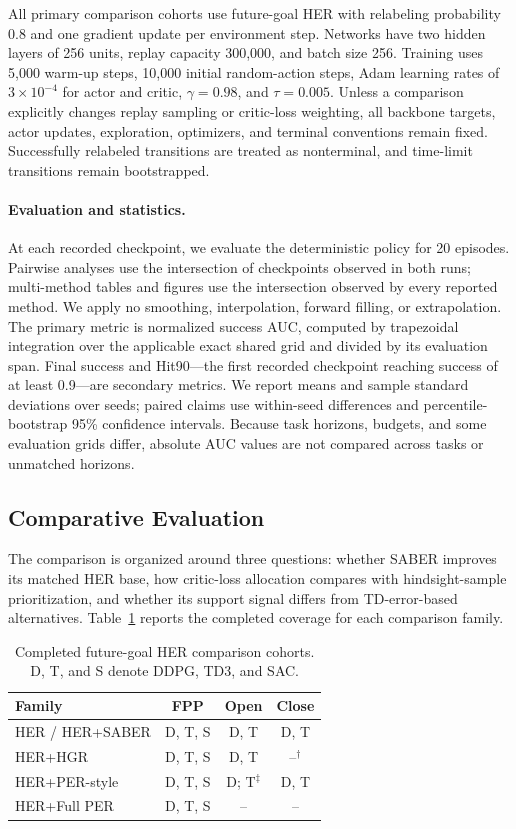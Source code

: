 \documentclass[letterpaper]{article}
\begin{document}
All primary comparison cohorts use future-goal HER with relabeling probability 0.8 and one gradient update per environment step. Networks have two hidden layers of 256 units, replay capacity 300,000, and batch size 256. Training uses 5,000 warm-up steps, 10,000 initial random-action steps, Adam learning rates of \(3\times10^{-4}\) for actor and critic, \(\gamma=0.98\), and \(\tau=0.005\). Unless a comparison explicitly changes replay sampling or critic-loss weighting, all backbone targets, actor updates, exploration, optimizers, and terminal conventions remain fixed. Successfully relabeled transitions are treated as nonterminal, and time-limit transitions remain bootstrapped.

\paragraph{Evaluation and statistics.}
At each recorded checkpoint, we evaluate the deterministic policy for 20 episodes. Pairwise analyses use the intersection of checkpoints observed in both runs; multi-method tables and figures use the intersection observed by every reported method. We apply no smoothing, interpolation, forward filling, or extrapolation. The primary metric is normalized success AUC, computed by trapezoidal integration over the applicable exact shared grid and divided by its evaluation span. Final success and Hit90---the first recorded checkpoint reaching success of at least 0.9---are secondary metrics. We report means and sample standard deviations over seeds; paired claims use within-seed differences and percentile-bootstrap 95\% confidence intervals. Because task horizons, budgets, and some evaluation grids differ, absolute AUC values are not compared across tasks or unmatched horizons.

\subsection{Comparative Evaluation}

The comparison is organized around three questions: whether SABER improves its matched HER base, how critic-loss allocation compares with hindsight-sample prioritization, and whether its support signal differs from TD-error-based alternatives. Table~\ref{tab:experimental-coverage} reports the completed coverage for each comparison family.

\begin{table}[!h]
\centering
\small
\caption{Completed future-goal HER comparison cohorts. D, T, and S denote DDPG, TD3, and SAC.}
\label{tab:experimental-coverage}
\begin{tabular}{lccc}
\toprule
Family & FPP & Open & Close \\
\midrule
HER / HER+SABER & D, T, S & D, T & D, T \\
HER+HGR & D, T, S & D, T & --$^{\dagger}$ \\
HER+PER-style & D, T, S & D; T$^{\ddagger}$ & D, T \\
HER+Full PER & D, T, S & -- & -- \\
\bottomrule
\end{tabular}
\end{table}
\end{document}
